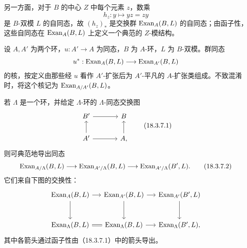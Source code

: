 另一方面，对于 $B$ 的中心 $Z$ 中每个元素 $z$，数乘
\[
 h_z:y\longmapsto yz=zy
\]
是 $B$-双模 $L$ 的自同态，故 $(h_z)_*$ 是交换群 $\operatorname{Exan}_A(B,L)$ 的自同态；由函子性，这些自同态在 $\operatorname{Exan}_A(B,L)$ 上定义一个典范的 $Z$-模结构。

设 $A,A'$ 为两个环，$u:A'\to A$ 为同态，$B$ 为 $A$-环，$L$ 为 $B$-双模。群同态
\[
 u^*:\operatorname{Exan}_A(B,L)\longrightarrow\operatorname{Exan}_{A'}(B,L)
\]
的核，按定义由那些经 $u$ 看作 $A'$-扩张后为 $A'$-平凡的 $A$-扩张类组成。不致混淆时，将这个核记为 $\operatorname{Exan}_{A/A'}(B,L)$。

若 $\Lambda$ 是一个环，并给定 $\Lambda$-环的 $\Lambda$-同态交换图
\begin{equation}
\begin{tikzcd}[column sep=large]
 B'\arrow[r]&B\\
 A'\arrow[r]\arrow[u]&A\arrow[u],
\end{tikzcd}
\tag{18.3.7.1}
\end{equation}
则可典范地导出同态
\begin{equation}
 \operatorname{Exan}_{A/\Lambda}(B,L)\longrightarrow
 \operatorname{Exan}_{A'/\Lambda}(B,L)\longrightarrow
 \operatorname{Exan}_{A'/\Lambda}(B',L).
 \tag{18.3.7.2}
\end{equation}
它们来自下图的交换性：
\[
\begin{tikzcd}[column sep=1.3em,row sep=large]
\Exan_A(B,L)\arrow[r]\arrow[d]&\Exan_{A'}(B,L)\arrow[r]\arrow[d]&
\Exan_{A'}(B',L)\arrow[d]\\
\Exan_\Lambda(B,L)\arrow[r,equal]&\Exan_\Lambda(B,L)\arrow[r]&
\Exan_\Lambda(B',L),
\end{tikzcd}
\]
其中各箭头通过函子性由（18.3.7.1）中的箭头导出。

